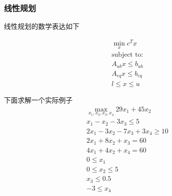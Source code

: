     \hypertarget{ux7ebfux6027ux89c4ux5212}{%
\subsubsection{线性规划}\label{ux7ebfux6027ux89c4ux5212}}

    线性规划的数学表达如下

\[
\begin{aligned}
\min\limits_{x}c^Tx\\
\text{subject to:}\\
A_{ub}x\le b_{ub}\\
A_{eq}x\le b_{eq}\\
l \le x\le u
\end{aligned}
\]

    下面求解一个实际例子 \[
\begin{aligned}
\max\limits_{x_1,x_2,x_3,x_4}29x_1+45x_2\\
x_1-x_2-3x_3\le 5\\
2x_1-3x_2-7x_3+3x_4\ge 10\\
2x_1+8x_2+x_3=60\\
4x_1+4x_2+x_4=60\\
0\le x_1\\
0\le x_2\le 5\\
x_3\le 0.5\\
-3\le x_4
\end{aligned}
\]

